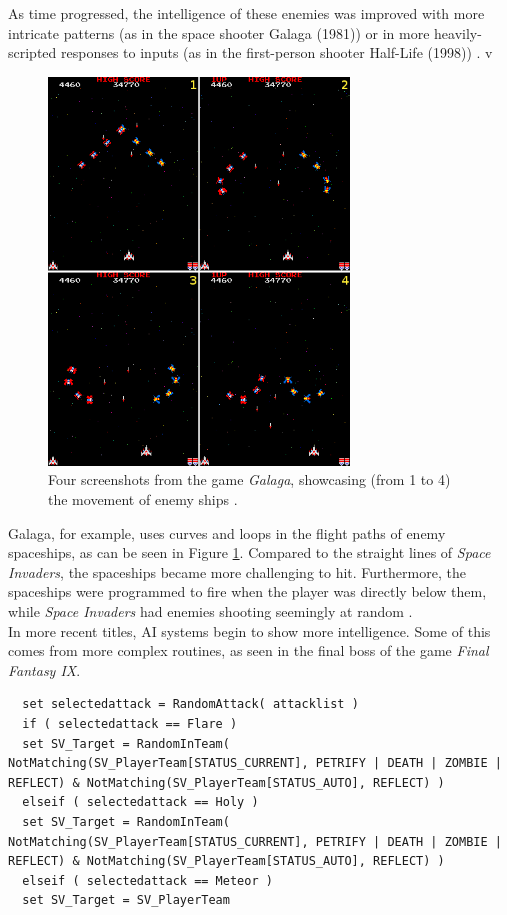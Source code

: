 As time progressed, the intelligence of these enemies was improved with more intricate patterns (as in the space shooter Galaga (1981)) or in more heavily-scripted responses to inputs (as in the first-person shooter Half-Life (1998)) \cite{schw04}.
v
\begin{figure}[H]
  \centering
  \includegraphics[width=8cm]{figures/ExampleGalaga.png}
  \caption{Four screenshots from the game \textit{Galaga}, showcasing (from 1 to 4) the movement of enemy ships \cite{galaga81}.}
  \label{fig:Galaga}
\end{figure}
Galaga, for example, uses curves and loops in the flight paths of enemy spaceships, as can be seen in Figure \ref{fig:Galaga}. Compared to the straight lines of \textit{Space Invaders}, the spaceships became more challenging to hit. Furthermore, the spaceships were programmed to fire when the player was directly below them, while \textit {Space Invaders} had enemies shooting seemingly at random \cite{schw04}.\\

In more recent titles, AI systems begin to show more intelligence. Some of this comes from more complex routines, as seen in the final boss of the game \textit{Final Fantasy IX}.

\begin{lstlisting}
  set selectedattack = RandomAttack( attacklist )
  if ( selectedattack == Flare )
  set SV_Target = RandomInTeam( NotMatching(SV_PlayerTeam[STATUS_CURRENT], PETRIFY | DEATH | ZOMBIE | REFLECT) & NotMatching(SV_PlayerTeam[STATUS_AUTO], REFLECT) )
  elseif ( selectedattack == Holy )
  set SV_Target = RandomInTeam( NotMatching(SV_PlayerTeam[STATUS_CURRENT], PETRIFY | DEATH | ZOMBIE | REFLECT) & NotMatching(SV_PlayerTeam[STATUS_AUTO], REFLECT) )
  elseif ( selectedattack == Meteor )
  set SV_Target = SV_PlayerTeam
\end{lstlisting}

